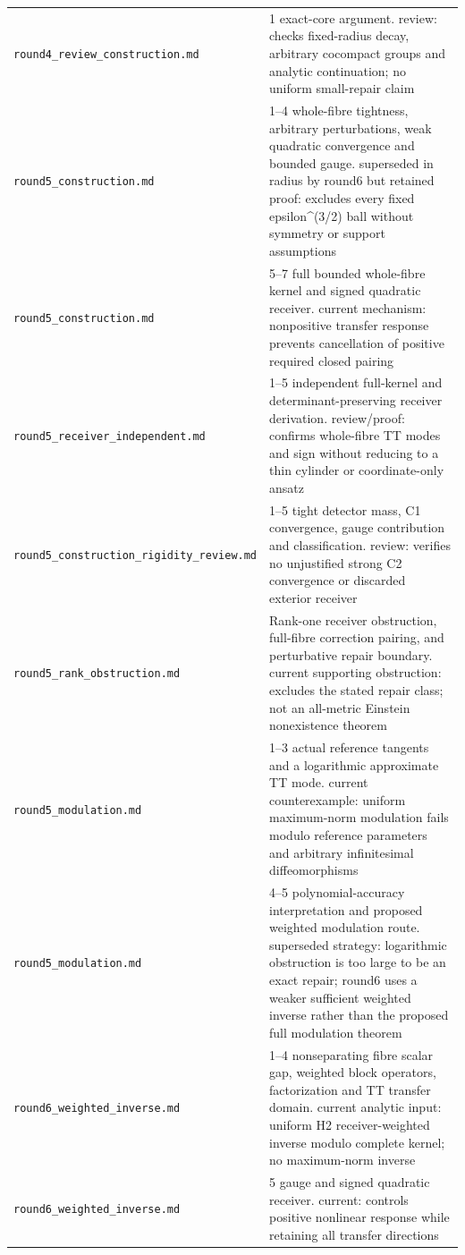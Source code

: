 \documentclass[UTF8,fontset=fandol,zihao=-4]{ctexart}
\theoremstyle{cn}
\begin{document}
\begin{longtable}{L{.34\textwidth}L{.59\textwidth}}
\nolinkurl{round4_review_construction.md} & 1 exact-core argument. review: checks fixed-radius decay, arbitrary cocompact groups and analytic continuation; no uniform small-repair claim\\
\nolinkurl{round5_construction.md} & 1–4 whole-fibre tightness, arbitrary perturbations, weak quadratic convergence and bounded gauge. superseded in radius by round6 but retained proof: excludes every fixed epsilon\textasciicircum{}(3/2) ball without symmetry or support assumptions\\
\nolinkurl{round5_construction.md} & 5–7 full bounded whole-fibre kernel and signed quadratic receiver. current mechanism: nonpositive transfer response prevents cancellation of positive required closed pairing\\
\nolinkurl{round5_receiver_independent.md} & 1–5 independent full-kernel and determinant-preserving receiver derivation. review/proof: confirms whole-fibre TT modes and sign without reducing to a thin cylinder or coordinate-only ansatz\\
\nolinkurl{round5_construction_rigidity_review.md} & 1–5 tight detector mass, C1 convergence, gauge contribution and classification. review: verifies no unjustified strong C2 convergence or discarded exterior receiver\\
\nolinkurl{round5_rank_obstruction.md} & Rank-one receiver obstruction, full-fibre correction pairing, and perturbative repair boundary. current supporting obstruction: excludes the stated repair class; not an all-metric Einstein nonexistence theorem\\
\nolinkurl{round5_modulation.md} & 1–3 actual reference tangents and a logarithmic approximate TT mode. current counterexample: uniform maximum-norm modulation fails modulo reference parameters and arbitrary infinitesimal diffeomorphisms\\
\nolinkurl{round5_modulation.md} & 4–5 polynomial-accuracy interpretation and proposed weighted modulation route. superseded strategy: logarithmic obstruction is too large to be an exact repair; round6 uses a weaker sufficient weighted inverse rather than the proposed full modulation theorem\\
\nolinkurl{round6_weighted_inverse.md} & 1–4 nonseparating fibre scalar gap, weighted block operators, factorization and TT transfer domain. current analytic input: uniform H2 receiver-weighted inverse modulo complete kernel; no maximum-norm inverse\\
\nolinkurl{round6_weighted_inverse.md} & 5 gauge and signed quadratic receiver. current: controls positive nonlinear response while retaining all transfer directions\\

\end{longtable}
\end{document}
